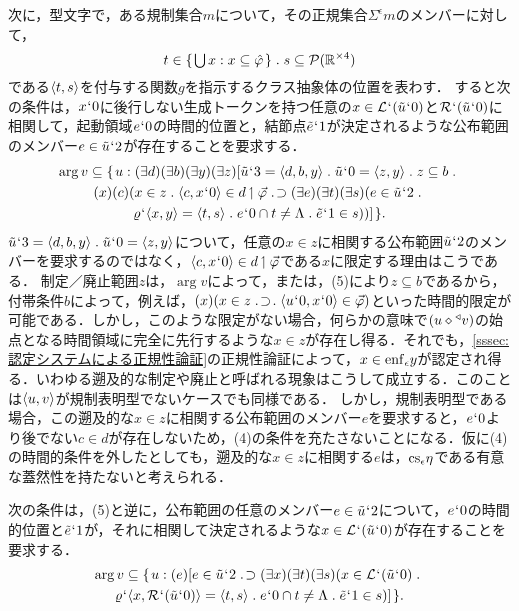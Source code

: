 次に，型文字\kagi{$ \varrho $}で，ある規制集合$ m $について，その正規集合$ \varSigma^{\epsilon}m $のメンバーに対して，
\[
    t\in\classab{\union{x}:x\subseteq\hat\varphi}\con{1}s\subseteq\mathcal{P}(\timex{\mathbb{R}}{4})
\]
である$\langle t,s \rangle$を付与する関数$ g $を指示するクラス抽象体の位置を表わす．
すると次の条件は，$x{\mspace{1mu}{`}\mspace{1mu}} 0$に後行しない生成トークンを持つ任意の$ x\in \mathcal{L}{\mspace{1mu}{`}\mspace{1mu}}(\tilde{u}{\mspace{1mu}{`}\mspace{1mu}} 0) $と$ \mathcal{R}{\mspace{1mu}{`}\mspace{1mu}}(\tilde{u}{\mspace{1mu}{`}\mspace{1mu}} 0) $に相関して，起動領域$e{\mspace{1mu}{`}\mspace{1mu}} 0$の時間的位置と，結節点$ \tilde{e}{\mspace{1mu}{`}\mspace{1mu}} 1 $が決定されるような公布範囲のメンバー$ e\in  \tilde{u}{\mspace{1mu}{`}\mspace{1mu}} 2 $が存在することを要求する．
\begin{multline}
    \arg v \subseteq \classab{u:(\exists d)(\exists b)(\exists y)(\exists z)[
        \tilde{u}\fap 3 = \orp{d,b,y}\con{1}\tilde{u}\fap 0 = \orp{z,y}\con{1}z\subseteq b \con{1}\\
        (x)(c)(x\in z\con{1}\orp{c,x\fap 0}\in d\uphl\vec{\varphi}\case{1}{1}{0}
        (\exists e)(\exists t)(\exists s)(e\in \tilde{u}\fap 2\con{1}\\
            \varrho\fap\orp{x,y} = \orp{t,s}\con{1}e\fap 0\cap t\neq\Lambda\con{1}\tilde{e}\fap 1\in s
        )
        )
    ]
    }.
\end{multline}
$ \tilde{u}\fap 3 = \orp{d,b,y}\con{1}\tilde{u}\fap 0 = \orp{z,y} $について，任意の$ x\in z $に相関する公布範囲$ \tilde{u}{\mspace{1mu}{`}\mspace{1mu}} 2 $のメンバーを要求するのではなく，$ \langle c,x{\mspace{1mu}{`}\mspace{1mu}} 0 \rangle\in d\mathbin{\upharpoonleft}\vec{\varphi} $である$x$に限定する理由はこうである．
制定／廃止範囲$ z $は，$ \arg v $によって，または，(5)により$ z\subseteq b $であるから，付帯条件$b$によって，例えば，$ (x)(x\in z\case{1}{1}{1}\orp{u\fap 0,x\fap 0}\in\vec{\varphi}) $といった時間的限定が可能である．しかし，このような限定がない場合，何らかの意味で$ (u\diamond{^\triangleleft}v) $の始点となる時間領域に完全に先行するような$ x\in z $が存在し得る．それでも，\ref{sssec:認定システムによる正規性論証}の正規性論証によって，$ x\in\mathrm{enf}_{\epsilon}y $が認定され得る．いわゆる遡及的な制定や廃止と呼ばれる現象はこうして成立する．このことは$\langle u,v \rangle$が規制表明型でないケースでも同様である．
しかし，規制表明型である場合，この遡及的な$ x\in z $に相関する公布範囲のメンバー$e$を要求すると，$e{\mspace{1mu}{`}\mspace{1mu}} 0$より後でない$ c\in d $が存在しないため，(4)の条件を充たさないことになる．仮に(4)の時間的条件を外したとしても，遡及的な$ x\in z $に相関する$e$は，$ \mathrm{cs}_{\epsilon}\eta $である有意な蓋然性を持たないと考えられる．

次の条件は，(5)と逆に，公布範囲の任意のメンバー$ e\in  \tilde{u}{\mspace{1mu}{`}\mspace{1mu}} 2 $について，$e{\mspace{1mu}{`}\mspace{1mu}} 0$の時間的位置と$ \tilde{e}{\mspace{1mu}{`}\mspace{1mu}} 1 $が，それに相関して決定されるような$x\in \mathcal{L}{\mspace{1mu}{`}\mspace{1mu}}(\tilde{u}{\mspace{1mu}{`}\mspace{1mu}} 0)$が存在することを要求する．
\begin{multline}
    \arg v\subseteq\classab{u:
    (e)[e\in \tilde{u}\fap 2\case{1}{1}{0}(\exists x)(\exists t)(\exists s)(
        x\in\mathcal{L}\fap(\tilde{u}\fap 0)\con{1}\\
        \varrho\fap\orp{x,\mathcal{R}\fap(\tilde{u}\fap 0)} = \orp{t,s}\con{1}e\fap 0\cap t\neq\Lambda\con{1}\tilde{e}\fap 1\in s
    )
    ]
    }.
\end{multline}

